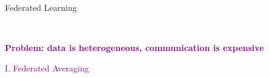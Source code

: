 \documentclass[aspectratio=169,12pt]{beamer}
\begin{document}
\begin{frame}[t]{Federated Learning}
\begin{minipage}{0.35\linewidth}
  \end{minipage}~~~~~~%
  \begin{minipage}{0.5\linewidth}

      
  \end{minipage}



      
  \pause
  \pause
  \pause
  \begin{center}
    \textcolor{purple}{\bfseries Problem: data is heterogeneous, communication is expensive}
  \end{center}
  
\end{frame}



\begin{frame}
  \begin{center}
    \huge \textcolor{purple}{
      I. Federated Averaging
      }
  \end{center}
\end{frame}
\end{document}

